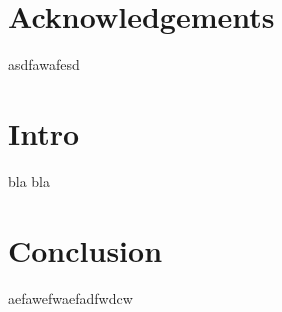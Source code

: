 \documentclass[capstoc,capschap,draftcls]{rpisudiss}
\begin{document}
\maketitle

\tableofcontents
\listoffigures
\listoftables

\chapter{Acknowledgements}
asdfawafesd


\chapter{Intro}
bla bla


\chapter{Conclusion}

aefawefwaefadfwdcw
\end{document}
